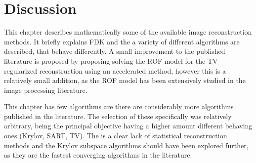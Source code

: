 \section{Discussion}

This chapter describes mathematically some of the available image reconstruction methods. It briefly explains FDK and the a variety of different algorithms are described, that behave differently. A small improvement to the published literature is proposed by proposing solving the ROF model for the TV regularized reconstruction using an accelerated method, however this is a relatively small addition, as the ROF model has been extensively studied in the image processing literature.

This chapter has few algorithms are there are considerably more algorithms published in the literature. The selection of these specifically was relatively arbitrary, being the principal objective having a higher amount different behaving ones (Krylov, SART, TV). The is a clear lack of statistical reconstruction methods and the Krylov subspace algorithms should have been explored further, as they are the fastest converging algorithms in the literature.
